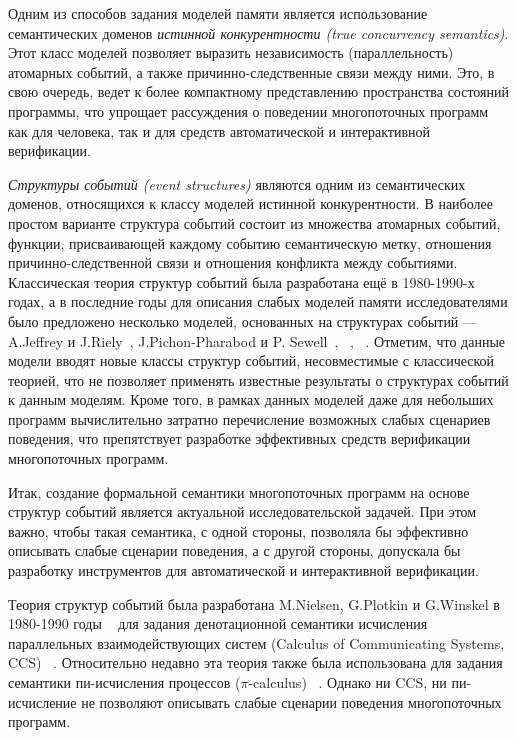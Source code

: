 Одним из способов задания моделей памяти
является использование семантических доменов
\emph{истинной конкурентности (true concurrency semantics)}.
Этот класс моделей позволяет выразить независимость (параллельность) атомарных событий, а также 
причинно-следственные связи между ними. Это, в свою очередь,
 ведет к более компактному представлению пространства состояний программы,
что упрощает рассуждения 
о поведении многопоточных программ как для человека, 
так и для  средств  автоматической и интерактивной верификации. 

\emph{Структуры событий (event structures)} являются одним из семантических доменов, 
относящихся к классу моделей истинной конкурентности.
В наиболее простом варианте структура событий состоит из множества атомарных событий,
функции, присваивающей каждому событию семантическую метку,
отношения причинно-следственной связи и отношения конфликта между событиями.
Классическая теория структур событий была разработана ещё в 1980-1990-х годах, а в последние годы для описания слабых моделей памяти исследователями было предложено несколько моделей,
основанных на структурах событий ---
A.Jeffrey и J.Riely~\autocite{Jeffrey-Riely:LICS16},
J.Pichon-Pharabod и P. Sewell~\autocite{PichonPharabod-Sewell:POPL16},
\Wkm~\autocite{Chakraborty-Vafeiadis:POPL19},
\MRD~\autocite{Paviotti-al:ESOP20}.
Отметим, что данные модели вводят новые классы
структур событий, несовместимые с классической теорией,
что не позволяет применять известные результаты
о структурах событий к данным моделям.
Кроме того, в рамках данных моделей даже для небольших программ
вычислительно затратно перечисление возможных слабых сценариев поведения,
что препятствует разработке эффективных средств верификации многопоточных программ.

Итак, создание формальной семантики 
многопоточных программ на основе структур событий является актуальной исследовательской задачей. 
При этом важно, чтобы такая семантика, с одной стороны, 
позволяла бы эффективно описывать слабые сценарии поведения, 
а с другой стороны, допускала бы разработку  
инструментов для автоматической и интерактивной верификации. 

{\progress}
Теория структур событий была разработана M.Nielsen, G.Plotkin и G.Winskel в 1980-1990 годы%
~\autocite{Nielsen:REX93,Sassone:MFCS1993,Vaandrager:TCS1991,Winskel-TCS:09} 
для задания денотационной семантики 
исчисления параллельных взаимодействующих систем (Calculus of Communicating Systems, CCS)%
~\autocite{Winskel:ICALP1982}.
Относительно недавно эта теория также была использована 
для задания семантики пи-исчисления процессов ($\pi$-calculus)%
~\autocite{Varacca-Nobuko:TCS10,Crafa-al:FSCCS12,Hildebrandt-al:LATA2017}.
Однако ни CCS, ни пи-исчисление не позволяют описывать 
слабые сценарии поведения многопоточных программ.

